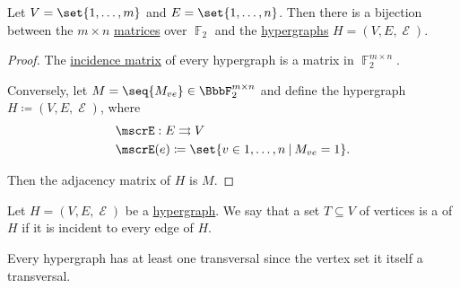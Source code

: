 \begin{proposition}\label{thm:graphs_as_linear_transformations}
  Let \( V = \set{ 1, \ldots, m } \) and \( E = \set{ 1, \ldots, n } \). Then there is a bijection between the \( m \times n \) \hyperref[def:array/matrix]{matrices} over \( \BbbF_2 \) and the \hyperref[def:hypergraph]{hypergraphs} \( H = (V, E, \mscrE) \).
\end{proposition}
\begin{proof}
  The \hyperref[def:hypergraph_incidence_matrix]{incidence matrix} of every hypergraph is a matrix in \( \BbbF_2^{m \times n} \).

  Conversely, let \( M = \seq{ M_{ve} } \in \BbbF_2^{m \times n} \) and define the hypergraph \( H \coloneqq (V, E, \mscrE) \), where
  \begin{equation*}
    \begin{aligned}
      &\mscrE: E \multto V \\
      &\mscrE(e) \coloneqq \set{ v \in 1, \ldots, n \given M_{ve} = 1 }.
    \end{aligned}
  \end{equation*}

  Then the adjacency matrix of \( H \) is \( M \).
\end{proof}

\begin{definition}\label{def:hypergraph_transversal}
  Let \( H = (V, E, \mscrE) \) be a \hyperref[def:hypergraph]{hypergraph}. We say that a set \( T \subseteq V \) of vertices is a  of \( H \) if it is incident to every edge of \( H \).
\end{definition}

\begin{example}\label{ex:hypergraph_vertex_set_is_transversal}
  Every hypergraph has at least one transversal since the vertex set it itself a transversal.
\end{example}

